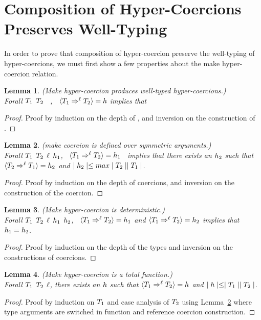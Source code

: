 \documentclass[acmtog, authorversion, acmlarge]{acmart}
\newtheorem{lem}{Lemma}
\begin{document}
\clearpage

\section{Composition of Hyper-Coercions Preserves Well-Typing}

In order to prove that composition of hyper-coercion preserve
the well-typing of hyper-coercions, we must first show a
few properties about the make hyper-coercion relation. 

\begin{lem}
  \label{lem:mk_hc_wt}
  (Make hyper-coercion produces well-typed hyper-coercions.)\\
  Forall $T_1$ $T_2$ \Lbl \, \HC, \,
  $\langle T_1 \Rightarrow^{\ell} T_2 \rangle = h$ implies that 
\end{lem}
\begin{proof}
  Proof by induction on the depth of \HC, and inversion
  on the construction of \HC. 
\end{proof}

\begin{lem}
  \label{lem:mk_hc_sym}
  (make coercion is defined over symmetric arguments.)\\
  Forall $T_1$ $T_2$ $\ell$ $h_1$, \,
  $\langle T_1 \Rightarrow^{\ell} T_2 \rangle = h_1$ \, implies that
  there exists an $h_2$ such that
  $\langle T_2 \Rightarrow^{\ell} T_1 \rangle = h_2$ and
  $\mid h_2 \mid \le max \mid T_2 \mid \mid T_1 \mid$.
\end{lem}
\begin{proof}
  Proof by induction on the depth of coercions, and inversion
  on the construction of the coercion. 
\end{proof}

\begin{lem}
  \label{lem:mk_hc_fn}
  (Make hyper-coercion is deterministic.)\\
  Forall $T_1$ $T_2$ $\ell$ $h_1$ $h_2$, \,
  $\langle T_1 \Rightarrow^{\ell} T_2 \rangle = h_1$ and
  $\langle T_1 \Rightarrow^{\ell} T_2 \rangle = h_2$ implies that
  $h_1 = h_2$.
\end{lem}
\begin{proof}
  Proof by induction on the depth of the types and
  inversion on the constructions of coercions. 
\end{proof}

\begin{lem}
  \label{lem:mk_hc_fn}
  (Make hyper-coercion is a total function.)\\
  Forall $T_1$ $T_2$ $\ell$,
  there exists an $h$ such that
  $\langle T_1 \Rightarrow^{\ell} T_2 \rangle = h$ and
  $\mid h \mid \le \mid T_1 \mid \mid T_2 \mid$.
\end{lem}
\begin{proof}
  Proof by induction on $T_1$ and case analysis of $T_2$
  using Lemma~\ref{lem:mk_hc_sym} where type arguments
  are switched in function and reference coercion construction. 
\end{proof}
\end{document}
